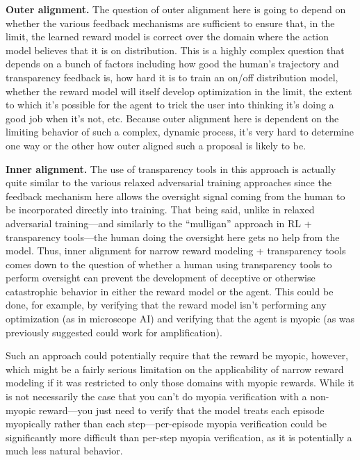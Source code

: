 \textbf{Outer alignment.} The question of outer alignment here is going to depend on whether the various feedback mechanisms are sufficient to ensure that, in the limit, the learned reward model is correct over the domain where the action model believes that it is on distribution. This is a highly complex question that depends on a bunch of factors including how good the human's trajectory and transparency feedback is, how hard it is to train an on/off distribution model, whether the reward model will itself develop optimization in the limit, the extent to which it's possible for the agent to trick the user into thinking it's doing a good job when it's not, etc. Because outer alignment here is dependent on the limiting behavior of such a complex, dynamic process, it's very hard to determine one way or the other how outer aligned such a proposal is likely to be.

\textbf{Inner alignment.} The use of transparency tools in this approach is actually quite similar to the various relaxed adversarial training approaches since the feedback mechanism here allows the oversight signal coming from the human to be incorporated directly into training. That being said, unlike in relaxed adversarial training---and similarly to the ``mulligan'' approach in RL + transparency tools---the human doing the oversight here gets no help from the model. Thus, inner alignment for narrow reward modeling + transparency tools comes down to the question of whether a human using transparency tools to perform oversight can prevent the development of deceptive\cite{TODO: cite https://www.alignmentforum.org/posts/zthDPAjh9w6Ytbeks/deceptive-alignment} or otherwise catastrophic\cite{TODO: cite https://ai-alignment.com/learning-with-catastrophes-59387b55cc30} behavior in either the reward model or the agent. This could be done, for example, by verifying that the reward model isn't performing any optimization (as in microscope AI) and verifying that the agent is myopic\cite{TODO: cite https://www.alignmentforum.org/posts/BKM8uQS6QdJPZLqCr/towards-a-mechanistic-understanding-of-corrigibility} (as was previously suggested could work for amplification).

Such an approach could potentially require that the reward be myopic, however, which might be a fairly serious limitation on the applicability of narrow reward modeling if it was restricted to only those domains with myopic rewards. While it is not necessarily the case that you can't do myopia verification with a non-myopic reward---you just need to verify that the model treats each episode myopically rather than each step---per-episode myopia verification could be significantly more difficult than per-step myopia verification, as it is potentially a much less natural behavior.

